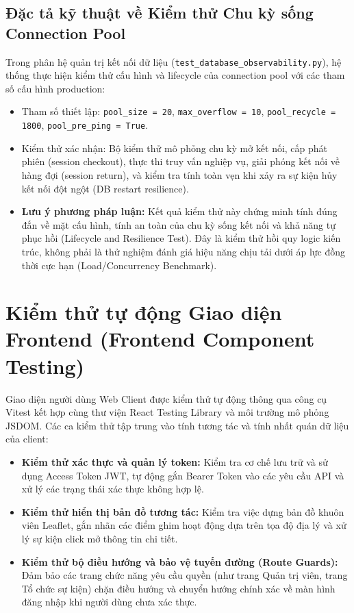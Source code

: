 \subsection{Đặc tả kỹ thuật về Kiểm thử Chu kỳ sống Connection Pool}
Trong phân hệ quản trị kết nối dữ liệu (\texttt{test\_database\_observability.py}), hệ thống thực hiện kiểm thử cấu hình và lifecycle của connection pool với các tham số cấu hình production:
\begin{itemize}
    \item Tham số thiết lập: \texttt{pool\_size = 20}, \texttt{max\_overflow = 10}, \texttt{pool\_recycle = 1800}, \texttt{pool\_pre\_ping = True}.
    \item Kiểm thử xác nhận: Bộ kiểm thử mô phỏng chu kỳ mở kết nối, cấp phát phiên (session checkout), thực thi truy vấn nghiệp vụ, giải phóng kết nối về hàng đợi (session return), và kiểm tra tính toàn vẹn khi xảy ra sự kiện hủy kết nối đột ngột (DB restart resilience).
    \item \textbf{Lưu ý phương pháp luận:} Kết quả kiểm thử này chứng minh tính đúng đắn về mặt cấu hình, tính an toàn của chu kỳ sống kết nối và khả năng tự phục hồi (Lifecycle and Resilience Test). Đây là kiểm thử hồi quy logic kiến trúc, không phải là thử nghiệm đánh giá hiệu năng chịu tải dưới áp lực đồng thời cực hạn (Load/Concurrency Benchmark).
\end{itemize}

\section{Kiểm thử tự động Giao diện Frontend (Frontend Component Testing)}
Giao diện người dùng Web Client được kiểm thử tự động thông qua công cụ Vitest kết hợp cùng thư viện React Testing Library và môi trường mô phỏng JSDOM. Các ca kiểm thử tập trung vào tính tương tác và tính nhất quán dữ liệu của client:
\begin{itemize}
    \item \textbf{Kiểm thử xác thực và quản lý token:} Kiểm tra cơ chế lưu trữ và sử dụng Access Token JWT, tự động gắn Bearer Token vào các yêu cầu API và xử lý các trạng thái xác thực không hợp lệ.
    \item \textbf{Kiểm thử hiển thị bản đồ tương tác:} Kiểm tra việc dựng bản đồ khuôn viên Leaflet, gắn nhãn các điểm ghim hoạt động dựa trên tọa độ địa lý và xử lý sự kiện click mở thông tin chi tiết.
    \item \textbf{Kiểm thử bộ điều hướng và bảo vệ tuyến đường (Route Guards):} Đảm bảo các trang chức năng yêu cầu quyền (như trang Quản trị viên, trang Tổ chức sự kiện) chặn điều hướng và chuyển hướng chính xác về màn hình đăng nhập khi người dùng chưa xác thực.
\end{itemize}

